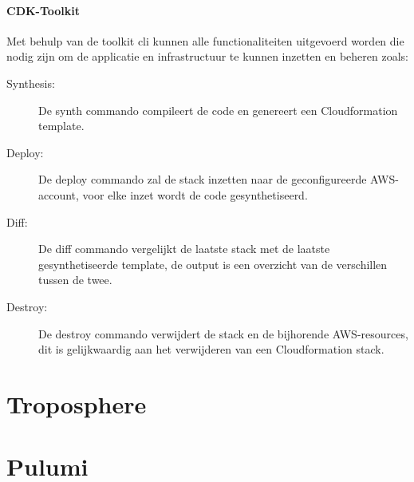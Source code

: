\paragraph{CDK-Toolkit}

Met behulp van de toolkit \acrshort{cli} kunnen alle functionaliteiten uitgevoerd worden die nodig zijn om de applicatie en infrastructuur te kunnen inzetten en beheren zoals:

\begin{description}
    \item[Synthesis:] De synth commando compileert de code en genereert een Cloudformation template.
    \item[Deploy:] De deploy commando zal de stack inzetten naar de geconfigureerde AWS-account, voor elke inzet wordt de code gesynthetiseerd.
    \item[Diff:] De diff commando vergelijkt de laatste stack met de laatste gesynthetiseerde template, de output is een overzicht van de verschillen tussen de twee.
    \item[Destroy:] De destroy commando verwijdert de stack en de bijhorende AWS-resources, dit is gelijkwaardig aan het verwijderen van een Cloudformation stack.
\end{description}

\section{Troposphere}
\label{sec:service-troposphere}


\section{Pulumi}
\label{sec:service-pulumi}

